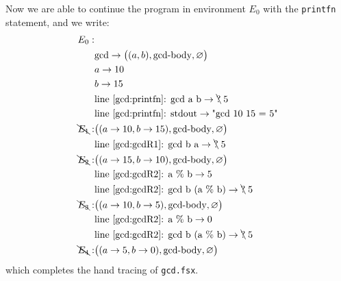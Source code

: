 Now we are able to continue the program in environment $E_0$ with the \lstinline!printfn! statement, and we write:
\begin{align*}
  E_0:&\\
      & \text{gcd} \rightarrow \big((a, b), \text{gcd-body}, \varnothing\big)\\
      & a \rightarrow 10\\
      & b \rightarrow 15\\
      & \text{line~\ref{gcd:printfn}: gcd a b} \rightarrow \bcancel{\text{?}}\; 5\\
      & \text{line~\ref{gcd:printfn}: stdout} \rightarrow \text{"gcd 10 15 = 5"}\\
  \bcancel{E_1}:& \big((a \rightarrow 10, b \rightarrow 15), \text{gcd-body}, \varnothing\big)\\
      & \text{line~\ref{gcd:gcdR1}: gcd b a} \rightarrow \bcancel{\text{?}}\; 5\\
  \bcancel{E_2}:& \big((a \rightarrow 15, b \rightarrow 10), \text{gcd-body}, \varnothing\big)\\
      & \text{line~\ref{gcd:gcdR2}: a \% b} \rightarrow 5\\
      & \text{line~\ref{gcd:gcdR2}: gcd b (a \% b)} \rightarrow \bcancel{\text{?}}\; 5\\
  \bcancel{E_3}:& \big((a \rightarrow 10, b \rightarrow 5), \text{gcd-body}, \varnothing\big)\\
      & \text{line~\ref{gcd:gcdR2}: a \% b} \rightarrow 0\\
      & \text{line~\ref{gcd:gcdR2}: gcd b (a \% b)} \rightarrow \bcancel{\text{?}}\; 5\\
  \bcancel{E_4}:& \big((a \rightarrow 5, b \rightarrow 0), \text{gcd-body}, \varnothing\big)\\
\end{align*}
which completes the hand tracing of \lstinline[language=console]{gcd.fsx}.

